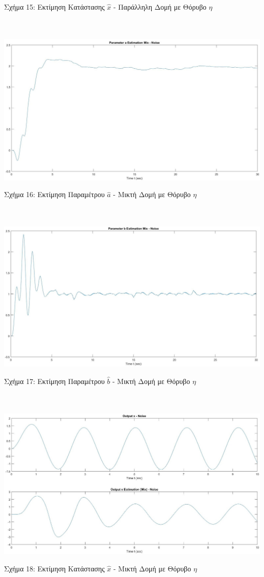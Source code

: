 \documentclass[12pt]{article}
\begin{document}
\centerline{Σχήμα 15: Εκτίμηση Κατάστασης $\hat{x}$ - Παράλληλη Δομή με Θόρυβο $\eta$}
\\ \\
\includegraphics[width=\linewidth]{a_estim_mix_Noise_2.jpg}
\centerline{Σχήμα 16: Εκτίμηση Παραμέτρου $\hat{a}$ - Μικτή Δομή με Θόρυβο $\eta$}
\\ \\
\includegraphics[width=\linewidth]{b_estim_mix_Noise_2.jpg}
\centerline{Σχήμα 17: Εκτίμηση Παραμέτρου $\hat{b}$ - Μικτή Δομή με Θόρυβο $\eta$}
\\ \\
\includegraphics[width=\linewidth]{x_estim_mix_Noise_2.jpg}
\centerline{Σχήμα 18: Εκτίμηση Κατάστασης $\hat{x}$ - Μικτή Δομή με Θόρυβο $\eta$}
\\
\newpage
\end{document}
